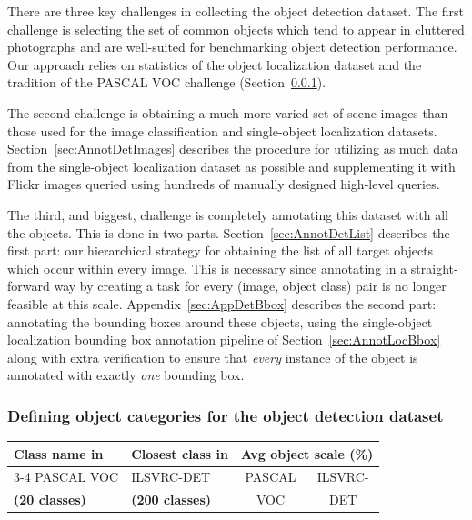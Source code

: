 \begin{table}

There are three key challenges in collecting the object detection dataset.
The first challenge is selecting the set of common objects which tend to appear in cluttered photographs
and are well-suited for benchmarking object detection performance. Our approach relies 
on statistics of the object localization dataset and the tradition of the
PASCAL VOC challenge (Section~\ref{sec:AnnotDetObjects}). 

The second challenge is obtaining a much more varied set of scene images than those used for
the image classification and single-object localization datasets. Section~\ref{sec:AnnotDetImages} describes the
procedure for utilizing as much data from the single-object localization dataset as possible and supplementing it with
Flickr images queried using hundreds of manually designed high-level queries.

The third, and biggest, challenge is 
completely annotating this dataset with all the objects. 
This is done in two parts. Section~\ref{sec:AnnotDetList} describes the first part: 
our hierarchical strategy for obtaining the list of all target objects which occur within every image. This is necessary since annotating in a straight-forward way by creating a task for every (image, object class) pair is no longer feasible at this scale. 
Appendix~\ref{sec:AppDetBbox} describes the second part: annotating the bounding boxes around these objects, using the single-object localization bounding box annotation pipeline of Section~\ref{sec:AnnotLocBbox} along with extra verification to ensure that \emph{every} instance of the object is annotated with exactly \emph{one} bounding box.


\subsubsection{Defining object categories for the object detection dataset}
\label{sec:AnnotDetObjects}

\begin{table}[t]
\centering
\begin{tabular}{|l|l| c| c|}
\hline
Class name in &  Closest class in & \multicolumn{2}{c|}{Avg object scale (\%)} \\
\cline{3-4}
PASCAL VOC & ILSVRC-DET & PASCAL & ILSVRC- \\
{\bf (20 classes)} & {\bf (200 classes)} & VOC & DET\\



\end{tabular}
\end{table}
\end{table}

